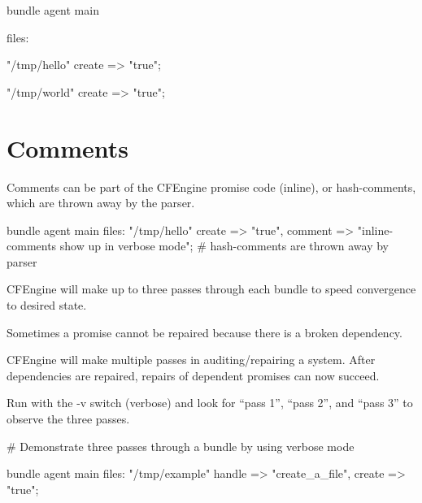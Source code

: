 \begin{codelisting}
\begin{code}
bundle agent main
{
  files:

      "/tmp/hello"
        create  => "true";

      "/tmp/world"
        create  => "true";
}
\end{code}
\end{codelisting}





\section{Comments}

Comments can be part of the CFEngine promise code (inline), or
hash-comments, which are thrown away by the parser.

\begin{codelisting}
\begin{code}
bundle agent main
{
  files:
      "/tmp/hello"
        create  => "true",
        comment => "inline-comments show up in verbose mode";
      # hash-comments are thrown away by parser
}
\end{code}
\end{codelisting}





CFEngine will make up to three passes through each bundle to speed
convergence to desired state.

Sometimes a promise cannot be repaired because there is a broken
dependency.

CFEngine will make multiple passes in auditing/repairing a system. After
dependencies are repaired, repairs of dependent promises can now succeed.

Run  with the -v switch (verbose) and look for ``pass 1'', ``pass
2'', and ``pass 3'' to observe the three passes.

\begin{codelisting}
\begin{code}
# Demonstrate three passes through a bundle by using verbose mode

bundle agent main
{
  files:
      "/tmp/example"
        handle => "create_a_file",
        create  => "true";
}
\end{code}
\end{codelisting}





